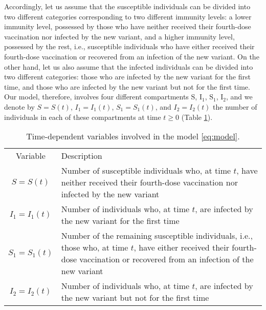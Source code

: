 \documentclass[11pt,reqno]{amsart}
\begin{document}
Accordingly, let us assume that the susceptible individuals can be divided into two different categories corresponding to two different immunity levels: a lower immunity level, possessed by those who have neither received their fourth-dose vaccination nor infected by the new variant, and a higher immunity level, possessed by the rest, i.e., susceptible individuals who have either received their fourth-dose vaccination or recovered from an infection of the new variant. On the other hand, let us also assume that the infected individuals can be divided into two different categories: those who are infected by the new variant for the first time, and those who are infected by the new variant but not for the first time. Our model, therefore, involves four different compartments $\text{S}$, $\text{I}_1$, $\text{S}_1$, $\text{I}_2$, and we denote by $S=S(t)$, $I_1=I_1(t)$, $S_1=S_1(t)$, and $I_2=I_2(t)$ the number of individuals in each of these compartments at time $t\geqslant0$ (Table \ref{tab:variables}).

\begin{table}\centering%
\begin{tabular}{|c|l|}\hline
Variable & Description\\
\hhline{|=|=|}
$S=S(t)$ & \begin{minipage}{0.8\linewidth}\medskip Number of susceptible individuals who, at time $t$, have neither received their fourth-dose vaccination nor infected by the new variant\end{minipage}\\[0.4cm]\hline
$I_1=I_1(t)$ & \begin{minipage}{0.8\linewidth}\medskip Number of individuals who, at time $t$, are infected by the new variant for the first time\end{minipage}\\[0.4cm]\hline
$S_1=S_1(t)$ & \begin{minipage}{0.8\linewidth}\medskip Number of the remaining susceptible individuals, i.e., those who, at time $t$, have either received their fourth-dose vaccination or recovered from an infection of the new variant\end{minipage}\\[0.6cm]\hline
$I_2=I_2(t)$ & \begin{minipage}{0.8\linewidth}\medskip Number of individuals who, at time $t$, are infected by the new variant but not for the first time\end{minipage}\\[0.4cm]\hline
\end{tabular}
\caption{\label{tab:variables} Time-dependent variables involved in the model \eqref{eq:model}.}
\end{table}
\end{document}
